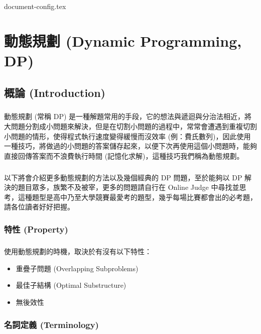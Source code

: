\documentclass[12pt,a4paper,oneside]{report}
\begin{document}
\begin{CJK}{UTF8}{bkai}

{document-config.tex}
\setcounter{chapter}{5}

\fi

\chapter{動態規劃 (Dynamic Programming, DP)}

\section{概論 (Introduction)}

\paragraph{}動態規劃 (常稱 DP) 是一種解題常用的手段，它的想法與遞迴與分治法相近，將大問題分割成小問題來解決，但是在切割小問題的過程中，常常會遭遇到重複切割小問題的情形，使得程式執行速度變得緩慢而沒效率 (例：費氏數列)，因此使用一種技巧，將做過的小問題的答案儲存起來，以便下次再使用這個小問題時，能夠直接回傳答案而不浪費執行時間 (記憶化求解)，這種技巧我們稱為動態規劃。
\paragraph{}以下將會介紹更多動態規劃的方法以及幾個經典的 DP 問題，至於能夠以 DP 解決的題目眾多，族繁不及被宰，更多的問題請自行在 Online Judge 中尋找並思考，這種題型是高中乃至大學競賽最愛考的題型，幾乎每場比賽都會出的必考題，請各位讀者好好把握。

\subsection{特性 (Property)}

\paragraph{}使用動態規劃的時機，取決於有沒有以下特性：
\begin{itemize}
\item 重疊子問題 (Overlapping Subproblems)
\item 最佳子結構 (Optimal Substructure)
\item 無後效性
\end{itemize}

\subsection{名詞定義 (Terminology)}


\end{CJK}
\end{document}
